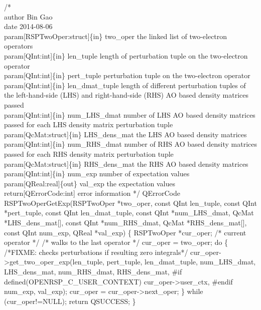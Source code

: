 /*%
    \\author Bin Gao
    \\date 2014-08-06
    \\param[RSPTwoOper:struct]\{in\} two_oper the linked list of two-electron operators
    \\param[QInt:int]\{in\} len_tuple length of perturbation tuple on the two-electron operator
    \\param[QInt:int]\{in\} pert_tuple perturbation tuple on the two-electron operator
    \\param[QInt:int]\{in\} len_dmat_tuple length of different perturbation tuples
        of the left-hand-side (LHS) and right-hand-side (RHS) AO based density
        matrices passed
    \\param[QInt:int]\{in\} num_LHS_dmat number of LHS AO based density matrices
        passed for each LHS density matrix perturbation tuple
    \\param[QcMat:struct]\{in\} LHS_dens_mat the LHS AO based density matrices
    \\param[QInt:int]\{in\} num_RHS_dmat number of RHS AO based density matrices
        passed for each RHS density matrix perturbation tuple
    \\param[QcMat:struct]\{in\} RHS_dens_mat the RHS AO based density matrices
    \\param[QInt:int]\{in\} num_exp number of expectation values
    \\param[QReal:real]\{out\} val_exp the expectation values
    \\return[QErrorCode:int] error information
*/
QErrorCode RSPTwoOperGetExp(RSPTwoOper *two_oper,
                            const QInt len_tuple,
                            const QInt *pert_tuple,
                            const QInt len_dmat_tuple,
                            const QInt *num_LHS_dmat,
                            QcMat *LHS_dens_mat[],
                            const QInt *num_RHS_dmat,
                            QcMat *RHS_dens_mat[],
                            const QInt num_exp,
                            QReal *val_exp)
\{
    RSPTwoOper *cur_oper;  /* current operator */
    /* walks to the last operator */
    cur_oper = two_oper;
    do \{
/*FIXME: checks perturbations if resulting zero integrals*/
        cur_oper->get_two_oper_exp(len_tuple,
                                   pert_tuple,
                                   len_dmat_tuple,
                                   num_LHS_dmat,
                                   LHS_dens_mat,
                                   num_RHS_dmat,
                                   RHS_dens_mat,
#if defined(OPENRSP_C_USER_CONTEXT)
                                   cur_oper->user_ctx,
#endif
                                   num_exp,
                                   val_exp);
        cur_oper = cur_oper->next_oper;
    \} while (cur_oper!=NULL);
    return QSUCCESS;
\}

